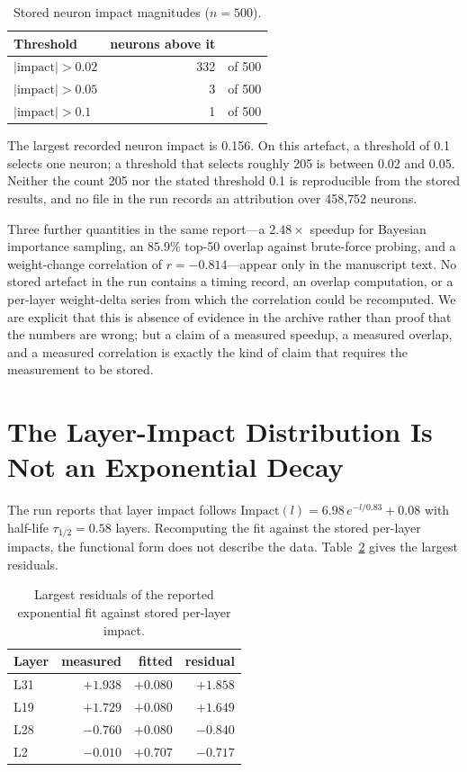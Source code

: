 \documentclass[11pt]{article}
\begin{document}
\begin{table}[h]\centering
\caption{Stored neuron impact magnitudes ($n=500$).}
\label{tab:neurons}
\begin{tabular}{lrr}
\toprule
Threshold & neurons above it & \\
\midrule
$|\text{impact}| > 0.02$ & 332 & of 500 \\
$|\text{impact}| > 0.05$ & 3 & of 500 \\
$|\text{impact}| > 0.1$ & 1 & of 500 \\
\bottomrule
\end{tabular}
\end{table}

The largest recorded neuron impact is 0.156. On this artefact, a threshold of 0.1 selects one neuron; a threshold that selects roughly 205 is between 0.02 and 0.05. Neither the count 205 nor the stated threshold 0.1 is reproducible from the stored results, and no file in the run records an attribution over 458{,}752 neurons.

Three further quantities in the same report---a $2.48\times$ speedup for Bayesian importance sampling, an $85.9\%$ top-50 overlap against brute-force probing, and a weight-change correlation of $r = -0.814$---appear only in the manuscript text. No stored artefact in the run contains a timing record, an overlap computation, or a per-layer weight-delta series from which the correlation could be recomputed. We are explicit that this is absence of evidence in the archive rather than proof that the numbers are wrong; but a claim of a measured speedup, a measured overlap, and a measured correlation is exactly the kind of claim that requires the measurement to be stored.

\section{The Layer-Impact Distribution Is Not an Exponential Decay}
The run reports that layer impact follows $\text{Impact}(l) = 6.98\,e^{-l/0.83} + 0.08$ with half-life $\tau_{1/2} = 0.58$ layers. Recomputing the fit against the stored per-layer impacts, the functional form does not describe the data. Table~\ref{tab:fit} gives the largest residuals.

\begin{table}[h]\centering
\caption{Largest residuals of the reported exponential fit against stored per-layer impact.}
\label{tab:fit}
\begin{tabular}{lrrr}
\toprule
Layer & measured & fitted & residual \\
\midrule
L31 & $+1.938$ & $+0.080$ & $+1.858$ \\
L19 & $+1.729$ & $+0.080$ & $+1.649$ \\
L28 & $-0.760$ & $+0.080$ & $-0.840$ \\
L2  & $-0.010$ & $+0.707$ & $-0.717$ \\
\bottomrule
\end{tabular}
\end{table}
\end{document}
